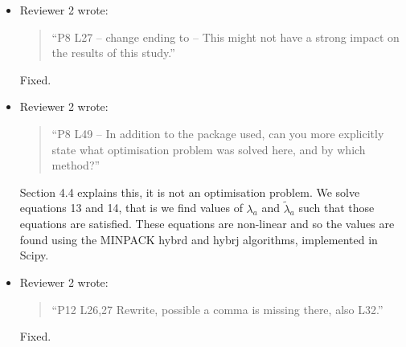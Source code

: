 \documentclass{article}
\begin{document}
\begin{itemize}
\item Reviewer 2 wrote:
\begin{quote}
``P8 L27 – change ending to – This might not have a strong impact on the results of this study.''
\end{quote}
Fixed.

\item Reviewer 2 wrote:
\begin{quote}
``P8 L49 – In addition to the package used, can you more explicitly state what optimisation problem was solved here, and by which method?''
\end{quote}
Section 4.4 explains this, it is not an optimisation problem. We solve equations 13 and 14, that is we find values of $\lambda_a$ and $\tilde{\lambda}_a$ such that those equations are satisfied. These equations are non-linear and so the values are found using the MINPACK hybrd and hybrj algorithms, implemented in Scipy.

\item Reviewer 2 wrote:
\begin{quote}
``P12 L26,27 Rewrite, possible a comma is missing there, also L32.''
\end{quote}
Fixed.

\end{itemize}
\end{document}
